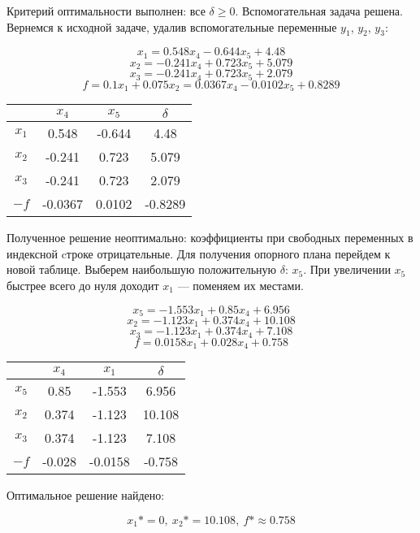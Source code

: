 \documentclass[listings]{labreport}
\begin{document}
Критерий оптимальности выполнен: все $\delta \geqslant 0$. Вспомогательная
задача решена. Вернемся к исходной задаче, удалив вспомогательные переменные
$y_1$, $y_2$, $y_3$:

$$x_1 = 0.548 x_4 - 0.644 x_5 + 4.48$$
$$x_2 = -0.241 x_4 + 0.723 x_5 + 5.079$$
$$x_3 = -0.241 x_4 + 0.723 x_5 + 2.079$$
$$f = 0.1x_1 + 0.075x_2 = 0.0367 x_4 - 0.0102 x_5 + 0.8289$$

\begin{center}
\begin{tabular}{c|ccc}
& $x_4$ & $x_5$ & $\delta$ \\\hline
$x_1$ & 0.548 & -0.644 & 4.48 \\
$x_2$ & -0.241 & 0.723 & 5.079 \\
$x_3$ & -0.241 & 0.723 & 2.079 \\
$-f$ & -0.0367 & 0.0102 & -0.8289 \\\hline
\end{tabular}
\end{center}

Полученное решение неоптимально: коэффициенты при свободных переменных в индексной
cтроке отрицательные. Для получения опорного плана перейдем к новой таблице.
Выберем наибольшую положительную $\delta$: $x_5$. При увеличении $x_5$
быстрее всего до нуля доходит $x_1$ — поменяем их местами.

$$x_5 = -1.553 x_1 + 0.85 x_4 + 6.956$$
$$x_2 = -1.123 x_1 + 0.374 x_4 + 10.108$$
$$x_3 = -1.123 x_1 + 0.374 x_4 + 7.108$$
$$f = 0.0158 x_1 + 0.028 x_4 + 0.758$$

\begin{center}
\begin{tabular}{c|ccc}
& $x_4$ & $x_1$ & $\delta$ \\\hline
$x_5$ & 0.85 & -1.553 & 6.956 \\
$x_2$ & 0.374 & -1.123 & 10.108 \\
$x_3$ & 0.374 & -1.123 & 7.108 \\
$-f$ & -0.028 & -0.0158 & -0.758 \\\hline
\end{tabular}
\end{center}

Оптимальное решение найдено:

$$x_1* = 0,\ x_2* = 10.108,\ f* \approx 0.758$$
\end{document}
